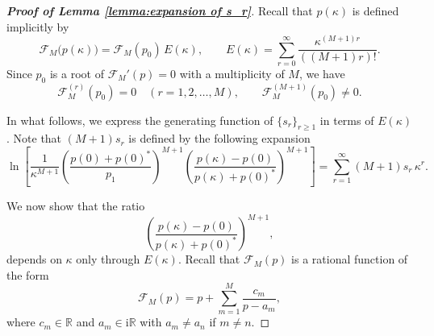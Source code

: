 \documentclass[preprint,3p,10pt]{elsarticle}
\theoremstyle{definition}
\begin{document}
\begin{proof}[\bf Proof of Lemma \ref{lemma:expansion of s_r}]
Recall that $p(\kappa)$ is defined implicitly by
\begin{equation}
\mathcal{F}_M\bigl(p(\kappa)\bigr)
=\mathcal{F}_M(p_0)\,E(\kappa),\qquad 
E(\kappa)=\sum_{r=0}^{\infty}\frac{\kappa^{(M+1)r}}{((M+1)r)!}.
\end{equation}
Since $p_0$ is a root of $\mathcal{F}_M'(p)=0$ with a multiplicity of $M$, we have
\begin{equation}\label{eq:multi-root-assumption}
\mathcal{F}_M^{(r)}(p_0)=0\quad (r=1,2,\dots,M), 
\qquad \mathcal{F}_M^{(M+1)}(p_0)\neq 0.
\end{equation}

In what follows, we express the generating function of
\(\{s_r\}_{r\ge1}\) in terms of \(E(\kappa)\).
Note that $(M+1)s_r$ is defined by the following expansion
\begin{equation}\label{eq:s-def}
\ln\!\left[\frac{1}{\kappa^{M+1}}
\left(\frac{p(0)+p(0)^*}{p_1}\right)^{M+1}
\left(\frac{p(\kappa)-p(0)}{p(\kappa)+p(0)^*}\right)^{M+1}\right]
=\sum_{r=1}^{\infty}(M+1)s_r\,\kappa^r.
\end{equation}

We now show that the ratio
\begin{equation}\label{eq:ratio}
\left(\frac{p(\kappa)-p(0)}{p(\kappa)+p(0)^*}\right)^{M+1},
\end{equation}
depends on $\kappa$ only through $E(\kappa)$.
Recall that $\mathcal{F}_M(p)$ is a rational function of the form
\begin{equation}
    \mathcal{F}_M(p)=p+\sum_{m=1}^{M}\frac{c_m}{p-a_m},
\end{equation}
where $c_m \in \mathbb{R}$ and $a_m \in \mathrm{i} \mathbb{R}$ with $ a_m \not = a_n$ if $m \not = n$. 


\end{proof}
\end{document}
